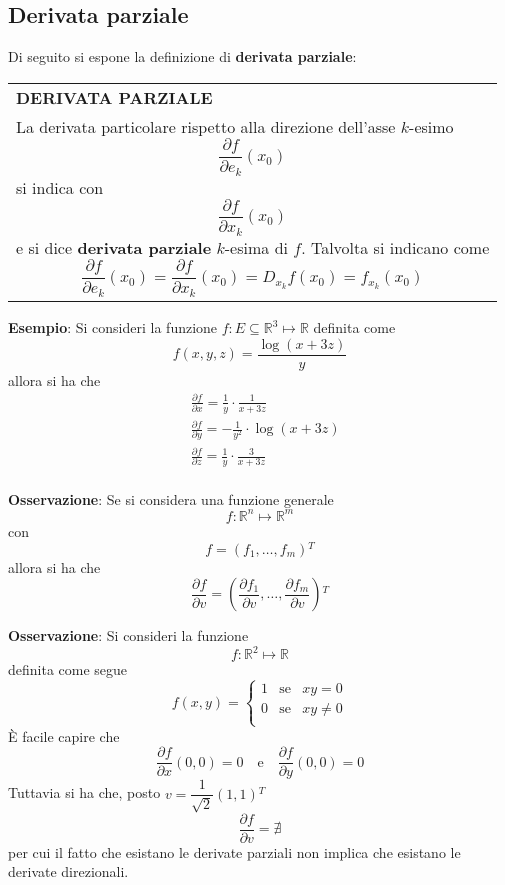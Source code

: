 \documentclass[a4paper]{extarticle}
\renewcommand\arraystretch{}
\begin{document}
\vspace{1em}
\noindent
\subsection{Derivata parziale}
Di seguito si espone la definizione di \textbf{derivata parziale}:

\vspace{1em}
\setlength{\tabcolsep}{14pt}
\renewcommand{\arraystretch}{2}
\noindent
\begin{tabularx}{\textwidth}{@{}|P|@{}}
    \hline
    {\textbf{DERIVATA PARZIALE}}\\
    \parbox{\linewidth}{La derivata particolare rispetto alla direzione dell'asse $k$-esimo
    \[\frac{\partial f}{\partial e_k}(x_0)\]
    si indica con
    \[\frac{\partial f}{\partial x_k}(x_0)\]
    e si dice \textbf{derivata parziale} $k$-esima di $f$. Talvolta si indicano come
    \[\frac{\partial f}{\partial e_k} (x_0) = \frac{\partial f}{\partial x_k} (x_0) = D_{x_k} f(x_0) = f_{x_k}(x_0)\]
    \vspace{3mm}}\\
    \hline
\end{tabularx}

\vspace{2em}
\noindent
\textbf{Esempio}: Si consideri la funzione $f:E \subseteq \mathbb{R}^3\longmapsto \mathbb{R}$ definita come
\[f(x,y,z) = \frac{\log(x+3z)}{y}\]
allora si ha che
\begin{align*}
    &\frac{\partial f}{\partial x} = \frac{1}{y} \cdot \frac{1}{x+3z}\\
    &\frac{\partial f}{\partial y} = -\frac{1}{y^2} \cdot \log(x+3z)\\
    &\frac{\partial f}{\partial z} = \frac{1}{y} \cdot \frac{3}{x+3z}\\
\end{align*}

\vspace{1em}
\noindent
\textbf{Osservazione}: Se si considera una funzione generale
\[f : \mathbb{R}^n \longmapsto \mathbb{R}^m\]
con
\[f=(f_1,\dots,f_m){^T}\]
allora si ha che
\[\frac{\partial f}{\partial v} = \left(\frac{\partial f_1}{\partial v}, \dots, \frac{\partial f_m}{\partial v}\right){^T}\]

\vspace{1em}
\noindent
\textbf{Osservazione}: Si consideri la funzione
\[f:\mathbb{R}^2 \longmapsto \mathbb{R}\]
definita come segue
\[f(x,y) = \left\{
    \begin{array}{lll}
        1 & \text{se} & xy=0\\
        0 & \text{se} & xy \neq 0\\
    \end{array}
    \right.    
\]
È facile capire che
\[\frac{\partial f}{\partial x}(0,0)=0 \hspace{1em} \text{e} \hspace{1em} \frac{\partial f}{\partial y}(0,0)=0\]
Tuttavia si ha che, posto $v=\dfrac{1}{\sqrt{2}} (1,1){^T}$
\[\frac{\partial f}{\partial v} = \nexists\]
per cui il fatto che esistano le derivate parziali non implica che esistano le derivate direzionali.
\end{document}
